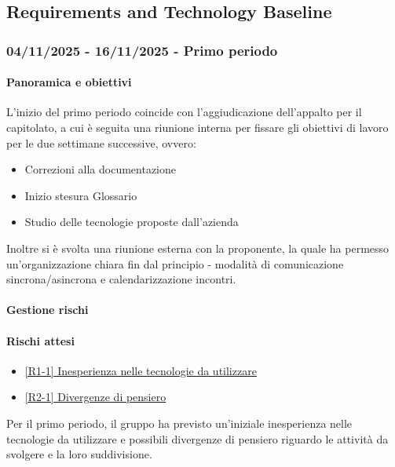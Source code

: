 \documentclass[a4paper,12pt]{article}
\begin{document}
    \subsection{Requirements and Technology Baseline}

        \subsubsection{04/11/2025 - 16/11/2025 - Primo periodo}
            \paragraph{Panoramica e obiettivi}
            L'inizio del primo periodo coincide con l'aggiudicazione dell'appalto per il capitolato, a cui è seguita una riunione interna per fissare gli obiettivi di lavoro per le due settimane successive, ovvero:
                \begin{itemize}
                    \item Correzioni alla documentazione
                    \item Inizio stesura Glossario
                    \item Studio delle tecnologie proposte dall'azienda
                \end{itemize}
            Inoltre si è svolta una riunione esterna con la proponente, la quale ha permesso un'organizzazione chiara fin dal principio - modalità di comunicazione sincrona/asincrona e calendarizzazione incontri.
            \paragraph{Gestione rischi}
            \paragraph*{Rischi attesi}
                \begin{itemize}
                    \item\hyperref[tab:r1]{[R1-1] Inesperienza nelle tecnologie da utilizzare}
                    \item\hyperref[tab:r2]{[R2-1] Divergenze di pensiero}
                \end{itemize}
                Per il primo periodo, il gruppo ha previsto un'iniziale inesperienza nelle tecnologie da utilizzare e possibili divergenze di pensiero riguardo le attività da svolgere e la loro suddivisione.
\end{document}
